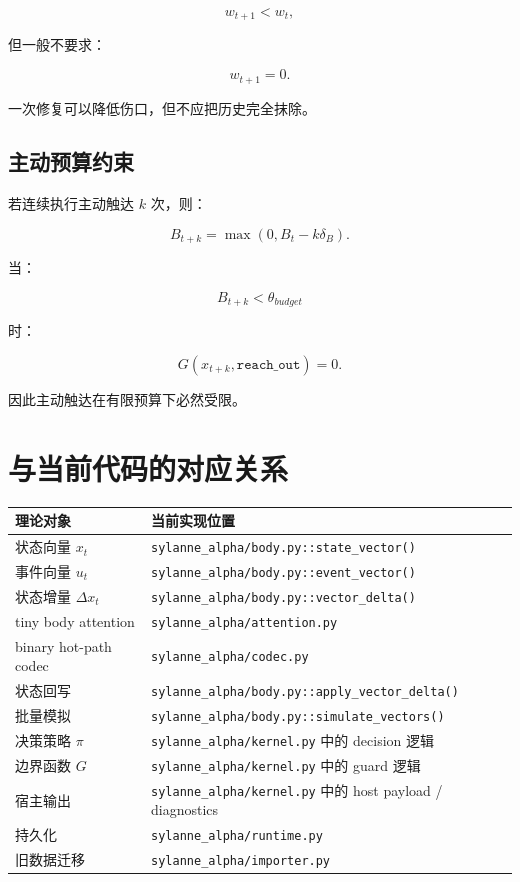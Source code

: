 \documentclass[UTF8,12pt]{ctexart}
\begin{document}
\[
w_{t+1}<w_t,
\]

但一般不要求：

\[
w_{t+1}=0.
\]

一次修复可以降低伤口，但不应把历史完全抹除。

\subsection{主动预算约束}

若连续执行主动触达 $k$ 次，则：

\[
B_{t+k}=\max(0,B_t-k\delta_B).
\]

当：

\[
B_{t+k}<\theta_{budget}
\]

时：

\[
G(x_{t+k},\texttt{reach\_out})=0.
\]

因此主动触达在有限预算下必然受限。

\section{与当前代码的对应关系}

\begin{longtable}{p{5cm} p{8cm}}
\toprule
理论对象 & 当前实现位置 \\
\midrule
状态向量 $x_t$ & \texttt{sylanne\_alpha/body.py::state\_vector()} \\
事件向量 $u_t$ & \texttt{sylanne\_alpha/body.py::event\_vector()} \\
状态增量 $\Delta x_t$ & \texttt{sylanne\_alpha/body.py::vector\_delta()} \\
tiny body attention & \texttt{sylanne\_alpha/attention.py} \\
binary hot-path codec & \texttt{sylanne\_alpha/codec.py} \\
状态回写 & \texttt{sylanne\_alpha/body.py::apply\_vector\_delta()} \\
批量模拟 & \texttt{sylanne\_alpha/body.py::simulate\_vectors()} \\
决策策略 $\pi$ & \texttt{sylanne\_alpha/kernel.py} 中的 decision 逻辑 \\
边界函数 $G$ & \texttt{sylanne\_alpha/kernel.py} 中的 guard 逻辑 \\
宿主输出 & \texttt{sylanne\_alpha/kernel.py} 中的 host payload / diagnostics \\
持久化 & \texttt{sylanne\_alpha/runtime.py} \\
旧数据迁移 & \texttt{sylanne\_alpha/importer.py} \\
\bottomrule
\end{longtable}
\end{document}
